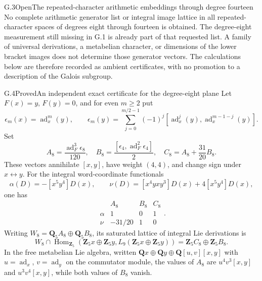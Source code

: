 \begin{statement}{G.3}{Open}{The repeated-character arithmetic embeddings through degree fourteen}
No complete arithmetic generator list or integral image lattice in
all repeated-character spaces of degrees eight through fourteen is
obtained. The degree-eight measurement still missing in G.1 is
already part of that requested list. A family of universal
derivations, a metabelian character, or dimensions of the lower
bracket images does not determine those generator vectors. The
calculations below are therefore recorded as ambient certificates,
with no promotion to a description of the Galois subgroup.
\end{statement}

\begin{statement}{G.4}{Proved}{An independent exact certificate for the degree-eight plane}
Let $F(x)=y$, $F(y)=0$, and for even $m\geq2$ put
\[
 \epsilon_m(x)=\operatorname{ad}_x^m(y),\qquad
 \epsilon_m(y)=\sum_{j=0}^{m/2-1}(-1)^j
 [\operatorname{ad}_x^j(y),\operatorname{ad}_x^{m-1-j}(y)].
\]
Set
\[
 A_8=\frac{\operatorname{ad}_F^3\epsilon_8}{120},\quad
 B_8=\frac{[\epsilon_4,\operatorname{ad}_F^2\epsilon_4]}2,
 \quad C_8=A_8+\frac{31}{20}B_8.
\]
These vectors annihilate $[x,y]$, have weight $(4,4)$, and change
sign under $x\leftrightarrow y$. For the integral word-coordinate
functionals
\[
 \alpha(D)=-[x^5y^4]D(x),\qquad
 \nu(D)=[x^4yxy^3]D(x)+4[x^5y^4]D(x),
\]
one has
\[
 \begin{array}{c|rrr}
 &A_8&B_8&C_8\\\hline
 \alpha&1&0&1\\
 \nu&-31/20&1&0
 \end{array}.
\]
Writing $W_8=\mathbf Q_5A_8\oplus\mathbf Q_5B_8$, its saturated
lattice of integral Lie derivations is
\[
 W_8\cap\operatorname{Hom}_{\mathbf Z_5}
       (\mathbf Z_5x\oplus\mathbf Z_5y,L_9(\mathbf Z_5x\oplus\mathbf Z_5y))
       =\mathbf Z_5C_8\oplus\mathbf Z_5B_8.
\]
In the free metabelian Lie algebra, written
$\mathbf Qx\oplus\mathbf Qy\oplus\mathbf Q[u,v][x,y]$ with
$u=\operatorname{ad}_x$, $v=\operatorname{ad}_y$ on the commutator
module, the values of $A_8$ are
$u^4v^3[x,y]$ and $u^3v^4[x,y]$, while both values of $B_8$ vanish.
\end{statement}
